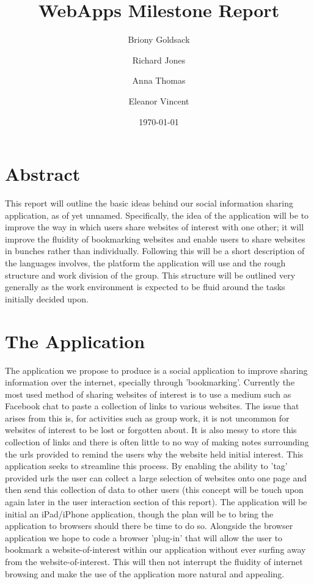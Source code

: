 \documentclass[a4wide, 10pt]{article}
\begin{document}
\title{WebApps Milestone Report}
\author{Briony Goldsack \and Richard Jones \and Anna Thomas \and Eleanor Vincent}
\date{\today}         
\maketitle            

\section{Abstract}

This report will outline the basic ideas behind our social information sharing application, as of yet unnamed. Specifically, the idea of the application will be to improve the way in which users share websites of interest with one other; it will improve the fluidity of bookmarking websites and enable users to share websites in bunches rather than individually. Following this will be a short description of the languages involves, the platform the application will use and the rough structure and work division of the group. This structure will be outlined very generally as the work environment is expected to be fluid around the tasks initially decided upon.

\section{The Application}

The application we propose to produce is a social application to improve sharing information over the internet, specially through 'bookmarking'. Currently the most used method of sharing websites of interest is to use a medium such as Facebook chat to paste a collection of links to various websites. The issue that arises from this is, for activities such as group work, it is not uncommon for websites of interest to be lost or forgotten about. It is also messy to store this collection of links and there is often little to no way of making notes surrounding the urls provided to remind the users why the website held initial interest. This application seeks to streamline this process. By enabling the ability to 'tag' provided urls the user can collect a large selection of websites onto one page and then send this collection of data to other users (this concept will be touch upon again later in the user interaction section of this report). The application will be initial an iPad/iPhone application, though the plan will be to bring the application to browsers should there be time to do so. Alongside the browser application we hope to code a browser 'plug-in' that will allow the user to bookmark a website-of-interest within our application without ever surfing away from the website-of-interest. This will then not interrupt the fluidity of internet browsing and make the use of the application more natural and appealing.
\end{document}
